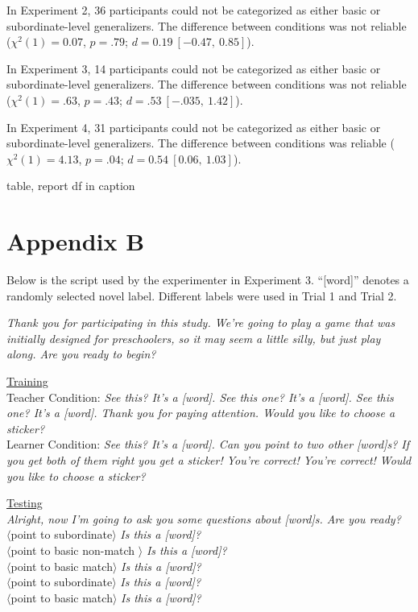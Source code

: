 \documentclass[man]{apa2}
\begin{document}
In Experiment 2,  36 participants could not be categorized as either basic or subordinate-level generalizers. The difference between conditions was not reliable ($\chi^2(1) = 0.07$,  $p = .79$; $d =0.19\ [-0.47,\ 0.85]$).

In Experiment 3,  14 participants could not be categorized as either basic or subordinate-level generalizers. The difference between conditions was not reliable ($\chi^2(1) = .63$,  $p = .43$; $d =.53\ [-.035,\ 1.42]$).

In Experiment 4,  31 participants could not be categorized as either basic or subordinate-level generalizers. The difference between conditions was reliable ($\chi^2(1) = 4.13$,  $p = .04$; $d =0.54\ [0.06,\ 1.03]$).

table, report df in caption

\section{Appendix B}
Below is the script used by the experimenter in Experiment 3. ``[word]'' denotes a randomly selected novel label. Different labels were used in Trial 1 and Trial 2. 

\vspace{5mm}

{\it Thank you for participating in this study. We're going to play a game that was initially designed for preschoolers, so it may seem a little silly, but just play along. Are you ready to begin?}
\vspace{2.5mm}

\noindent \underline{Training} \\
	Teacher Condition:  {\it See this? It's a [word]. See this one? It's a [word]. See this one? It's a [word]. Thank you for paying attention. Would you like to choose a sticker? }
\\
Learner Condition:  {\it See this? It's a [word].  Can you point to two other [word]s? If you get both of them right you get a sticker!  You're correct!  You're correct! Would you like to choose a sticker? }
\vspace{2.5mm}
 
\noindent  \underline{Testing} \\
{\it Alright, now I'm going to ask you some questions about [word]s. Are you ready?} \\
$\langle$point to subordinate$\rangle$ {\it Is this a [word]?} \\
$\langle$point to basic non-match $\rangle$ {\it  Is this a [word]?} \\
$\langle$point to basic match$\rangle$ {\it Is this a [word]?}\\
$\langle$point to subordinate$\rangle$ {\it Is this a [word]?} \\
$\langle$point to basic match$\rangle$ {\it Is this a [word]?} \\
 
\end{document}
